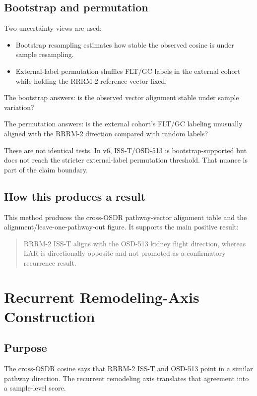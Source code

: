 \documentclass[11pt]{article}
\begin{document}
\subsection{Bootstrap and permutation}

Two uncertainty views are used:

\begin{itemize}
  \item Bootstrap resampling estimates how stable the observed cosine is under sample resampling.
  \item External-label permutation shuffles FLT/GC labels in the external cohort while holding the RRRM-2 reference vector fixed.
\end{itemize}

The bootstrap answers: is the observed vector alignment stable under sample variation?

The permutation answers: is the external cohort's FLT/GC labeling unusually aligned with the RRRM-2 direction compared with random labels?

These are not identical tests. In v6, ISS-T/OSD-513 is bootstrap-supported but does not reach the stricter external-label permutation threshold. That nuance is part of the claim boundary.

\subsection{How this produces a result}

This method produces the cross-OSDR pathway-vector alignment table and the alignment/leave-one-pathway-out figure. It supports the main positive result:

\begin{quote}
RRRM-2 ISS-T aligns with the OSD-513 kidney flight direction, whereas LAR is directionally opposite and not promoted as a confirmatory recurrence result.
\end{quote}

\section{Recurrent Remodeling-Axis Construction}

\subsection{Purpose}

The cross-OSDR cosine says that RRRM-2 ISS-T and OSD-513 point in a similar pathway direction. The recurrent remodeling axis translates that agreement into a sample-level score.
\end{document}
